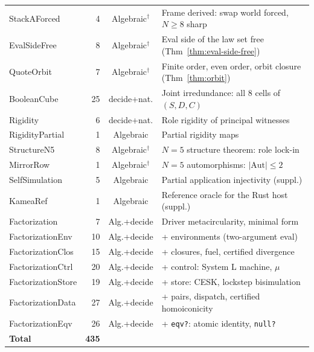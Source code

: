 \documentclass[sigconf,screen]{acmart}
\theoremstyle{remark}
\begin{document}
{\begin{tabular}{lrcl}
StackAForced         &  4 & Algebraic$^\dagger$ & Frame derived: swap world forced, $N \geq 8$ sharp \\
EvalSideFree         &  8 & Algebraic$^\dagger$ & Eval side of the law set free (Thm~\ref{thm:eval-side-free}) \\
QuoteOrbit           &  7 & Algebraic$^\dagger$ & Finite order, even order, orbit closure (Thm~\ref{thm:orbit}) \\
BooleanCube          & 25 & decide+nat. & Joint irredundance: all 8 cells of $(S,D,C)$ \\
Rigidity             &  6 & decide+nat. & Role rigidity of principal witnesses \\
RigidityPartial      &  1 & Algebraic & Partial rigidity maps \\
StructureN5          &  8 & Algebraic$^\dagger$ & $N\!=\!5$ structure theorem: role lock-in \\
MirrorRow            &  1 & Algebraic$^\dagger$ & $N\!=\!5$ automorphisms: $|\mathrm{Aut}| \leq 2$ \\
SelfSimulation       &  5 & Algebraic & Partial application injectivity (suppl.) \\
KameaRef             &  1 & Algebraic & Reference oracle for the Rust host (suppl.) \\
\hline
Factorization        &  7 & Alg.+decide & Driver metacircularity, minimal form \\
FactorizationEnv     & 10 & Alg.+decide & + environments (two-argument eval) \\
FactorizationClos    & 15 & Alg.+decide & + closures, fuel, certified divergence \\
FactorizationCtrl    & 20 & Alg.+decide & + control: System L machine, $\mu$ \\
FactorizationStore   & 19 & Alg.+decide & + store: CESK, lockstep bisimulation \\
FactorizationData    & 27 & Alg.+decide & + pairs, dispatch, certified homoiconicity \\
FactorizationEqv     & 26 & Alg.+decide & + \texttt{eqv?}: atomic identity, \texttt{null?} \\
\hline
\textbf{Total}       & \textbf{435} & & \\
\end{tabular}}
\end{document}
